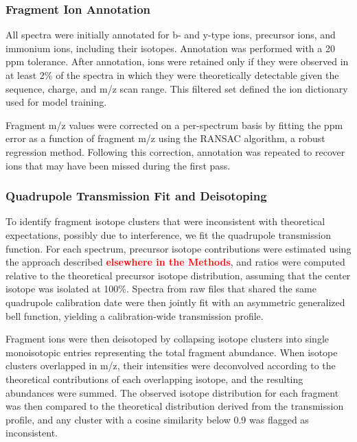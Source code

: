 \documentclass[pdflatex,sn-nature]{sn-jnl}
\begin{document}
\subsubsection{Fragment Ion Annotation}
All spectra were initially annotated for b- and y-type ions, precursor ions, and immonium ions, including their isotopes. Annotation was performed with a 20 ppm tolerance. After annotation, ions were retained only if they were observed in at least 2\% of the spectra in which they were theoretically detectable given the sequence, charge, and m/z scan range. This filtered set defined the ion dictionary used for model training.

Fragment m/z values were corrected on a per-spectrum basis by fitting the ppm error as a function of fragment m/z using the RANSAC algorithm, a robust regression method. Following this correction, annotation was repeated to recover ions that may have been missed during the first pass.

\subsubsection{Quadrupole Transmission Fit and Deisotoping}
To identify fragment isotope clusters that were inconsistent with theoretical expectations, possibly due to interference, we fit the quadrupole transmission function. For each spectrum, precursor isotope contributions were estimated using the approach described \textbf{\textcolor{red}{elsewhere in the Methods}}, and ratios were computed relative to the theoretical precursor isotope distribution, assuming that the center isotope was isolated at 100\%. Spectra from raw files that shared the same quadrupole calibration date were then jointly fit with an asymmetric generalized bell function, yielding a calibration-wide transmission profile.

Fragment ions were then deisotoped by collapsing isotope clusters into single monoisotopic entries representing the total fragment abundance. When isotope clusters overlapped in m/z, their intensities were deconvolved according to the theoretical contributions of each overlapping isotope, and the resulting abundances were summed. The observed isotope distribution for each fragment was then compared to the theoretical distribution derived from the transmission profile, and any cluster with a cosine similarity below 0.9 was flagged as inconsistent.
\end{document}
